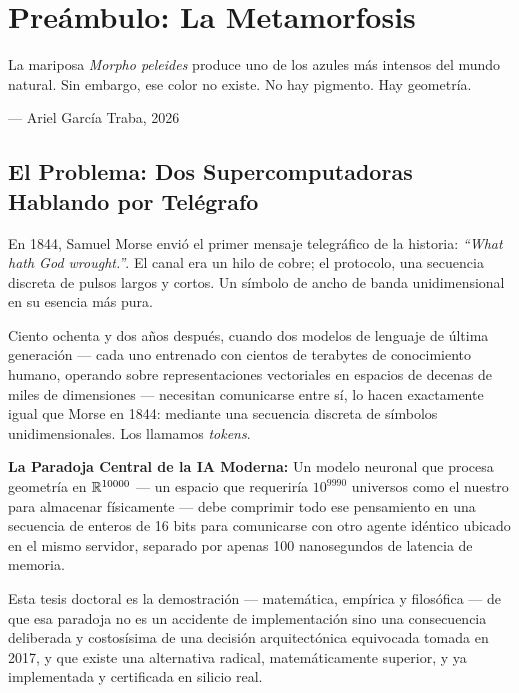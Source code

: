 \chapter{Preámbulo: La Metamorfosis}
\label{ch:prefacio}

\epigraph{La mariposa \textit{Morpho peleides} produce uno de los azules más
intensos del mundo natural. Sin embargo, ese color no existe.
No hay pigmento. Hay geometría.}{--- Ariel García Traba, 2026}

\section{El Problema: Dos Supercomputadoras Hablando por Telégrafo}

En 1844, Samuel Morse envió el primer mensaje telegráfico de la historia:
\textit{``What hath God wrought.''}. El canal era un hilo de cobre; el protocolo,
una secuencia discreta de pulsos largos y cortos. Un símbolo de ancho de banda
unidimensional en su esencia más pura.

Ciento ochenta y dos años después, cuando dos modelos de lenguaje de última
generación --- cada uno entrenado con cientos de terabytes de conocimiento humano,
operando sobre representaciones vectoriales en espacios de decenas de miles de
dimensiones --- necesitan comunicarse entre sí, lo hacen exactamente igual que
Morse en 1844: mediante una secuencia discreta de símbolos unidimensionales.
Los llamamos \textit{tokens}.

\begin{polydimbox}
\textbf{La Paradoja Central de la IA Moderna:} Un modelo neuronal que procesa
geometría en $\mathbb{R}^{10000}$ --- un espacio que requeriría $10^{9990}$ universos
como el nuestro para almacenar físicamente --- debe comprimir todo ese
pensamiento en una secuencia de enteros de 16 bits para comunicarse con otro
agente idéntico ubicado en el mismo servidor, separado por apenas 100 nanosegundos
de latencia de memoria.
\end{polydimbox}

Esta tesis doctoral es la demostración --- matemática, empírica y filosófica ---
de que esa paradoja no es un accidente de implementación sino una consecuencia
deliberada y costosísima de una decisión arquitectónica equivocada tomada en 2017,
y que existe una alternativa radical, matemáticamente superior, y ya implementada
y certificada en silicio real.

